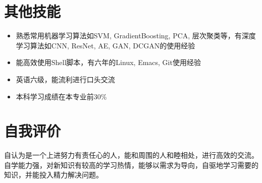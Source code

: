 \documentclass{resume}
\begin{document}
\section{其他技能}
\begin{itemize}%
\item 熟悉常用机器学习算法如SVM, GradientBoosting, PCA, 层次聚类等，有深度学习算法如CNN, ResNet, AE, GAN, DCGAN的使用经验
\item 能高效使用Shell脚本，有六年的Linux, Emacs, Git使用经验
\item 英语六级，能流利进行口头交流
\item 本科学习成绩在本专业前30\%
\end{itemize}

\section{自我评价}
\qquad 自认为是一个上进努力有责任心的人，能和周围的人和睦相处，进行高效的交流。自学能力强，对新知识有较高的学习热情，能够以需求为导向，自驱地学习需要的知识，并能投入精力解决问题。


%  
\end{document}

